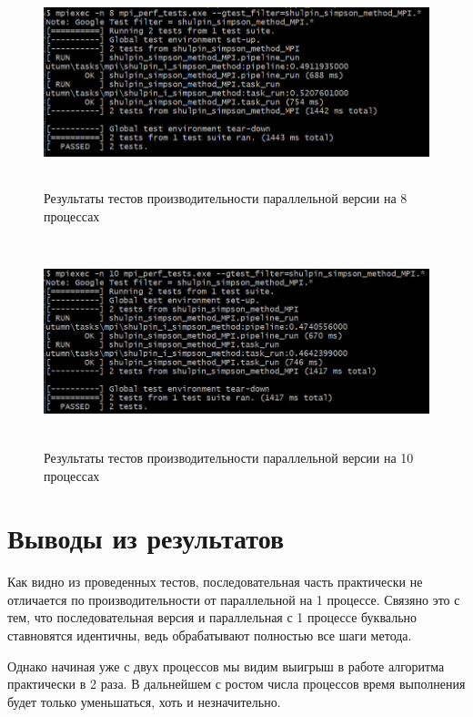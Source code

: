 \documentclass[12pt,a4paper]{article}
\begin{document}
\begin{figure}[H]
\centering
\includegraphics[height=6cm]{img/8nmpiperftest.jpg}
\caption{\label{fig:visualClass} Результаты тестов производительности параллельной версии на 8 процессах}
\end{figure}

\begin{figure}[H]
\centering
\includegraphics[height=6cm]{img/10nmpiperftest.jpg}
\caption{\label{fig:visualClass} Результаты тестов производительности параллельной версии на 10 процессах}
\end{figure}

\section*{Выводы из результатов}

Как видно из проведенных тестов, последовательная часть практически не отличается по производительности от параллельной на 1 процессе. Связяно это с тем, что последовательная версия и параллельная с 1 процессе буквально ставновятся идентичны, ведь обрабатывают полностью все шаги метода.

Однако начиная уже с двух процессов мы видим выигрыш в работе алгоритма практически в 2 раза. В дальнейшем с ростом числа процессов время выполнения будет только уменьшаться, хоть и незначительно.
\end{document}
